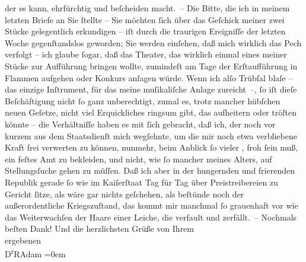 \begin{ledgroupsized}[t]{13cm}
                    der es kann, ehrfürchtig und beſcheiden {\pb}macht. –\pend
           \pstart
           Die Bitte, die ich in meinem letzten Briefe an Sie ſtellte – Sie möchten ſich
                    über das Geſchick meiner zwei Stücke gelegentlich erkundigen – iſt durch die
                    traurigen Ereigniſſe der letzten Woche gegenſtandslos geworden; Sie werden
                    einſehen, daß mich wirklich das Pech verfolgt – ich glaube ſogar, daß das
                    Theater, das wirklich einmal eines meiner Stücke zur Aufführung bringen wollte,
                    zumindeſt am Tage der Erſtaufführung in Flammen aufgehen oder Konkurs anſagen
                    würde. Wenn ich alſo Trübſal blaſe – das einzige Inſtrument, für das meine
                    muſikaliſche Anlage zureicht –, ſo iſt dieſe Beſchäftigung nicht ſo ganz
                    unberechtigt, zumal es, trotz mancher hübſchen neuen Geſetze, nicht viel
                    Erquickliches ringsum gibt, das aufheitern oder tröſten könnte – die
                    Verhältniſſe haben es mit ſich gebracht, daß ich, der noch vor kurzem aus dem
                    Staatsdienſt mich wegſehnte, um die mir noch etwa verbliebene Kraft frei
                    verwerten zu können, nunmehr, beim Anblick ſo vieler \label{K_L02315_1v}\label{K_L02315_1h}, froh ſein muß, ein feſtes Amt zu bekleiden, und
                    nicht, wie ſo mancher meines Alters, auf Stel{\pb}lungsſuche gehen zu müſſen. Daß ich
                    aber in der hungernden und frierenden Republik gerade ſo wie im Kaiſerſtaat Tag für Tag
                    über Preistreibereien zu Gericht ſitze, als wäre gar nichts geſchehen, als
                    beſtünde noch der außerordentliche Kriegszuſtand, das kommt mir manchmal ſo
                    grauenhaft vor wie das Weiterwachſen der Haare einer Leiche, die verfault und
                    zerfällt. –\pend
           \pstart
           Nochmals beſten Dank! Und die herzlichsten Grüße von Ihrem{\\[\baselineskip]}ergebenen{\\[\baselineskip]}\spacefill\mbox{D\textsuperscript{r}RAdam}\pend
           \leftskip=0em{}
         

\end{ledgroupsized}
